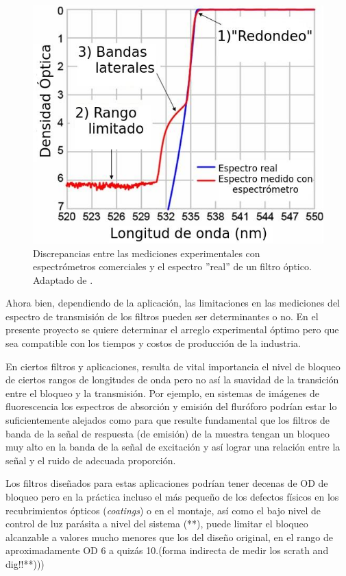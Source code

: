 \documentclass{ctuthesis}
\begin{document}
  
\begin{figure}[h!]
	\centering
	\includegraphics[scale=0.8]{Figs/plan_de_tesis/measurement_of_optical_filter.jpg}
	\caption{Discrepancias entre las mediciones experimentales con 
	espectrómetros 
	comerciales y el espectro ''real'' de un filtro óptico. Adaptado de 
	\cite{Semrock}.}
	\label{fig:obj1a}
\end{figure}

Ahora bien, dependiendo de la aplicación, las limitaciones en las mediciones 
del espectro de transmisión de los filtros pueden ser determinantes o no. En el 
presente proyecto se quiere determinar el arreglo experimental óptimo pero que 
sea compatible con los tiempos y costos de producción de la industria.

En ciertos filtros y aplicaciones, resulta de vital importancia el 
nivel de bloqueo de ciertos rangos de longitudes de onda pero no así la 
suavidad de la transición entre el bloqueo y la transmisión. Por ejemplo, en 
sistemas de 
imágenes de fluorescencia los espectros de absorción y emisión del fluróforo 
podrían estar lo suficientemente alejados como para que resulte fundamental que 
los filtros de banda de la señal de respuesta (de emisión) de la muestra tengan 
un bloqueo muy alto en la banda de la señal de excitación y así lograr una 
relación entre la señal y el ruido de adecuada proporción. 

Los filtros 
diseñados para estas aplicaciones podrían tener decenas de OD de bloqueo pero 
en 
la práctica incluso el más pequeño de los defectos físicos en los 
recubrimientos ópticos (\textit{coatings}) o en el montaje, así como el bajo 
nivel de control de luz parásita a nivel del sistema (**), puede limitar el 
bloqueo alcanzable a valores mucho menores que los del diseño original, en el 
rango de aproximadamente OD 6 a quizás 10.(forma indirecta de medir los scrath 
and dig!!**))) 
\end{document}
